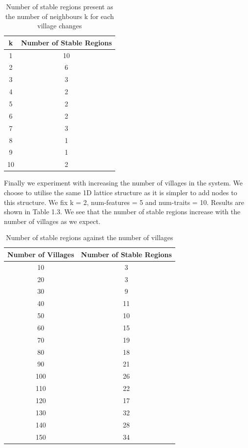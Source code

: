 \begin{table}[ht]
    \centering
    \begin{tabular}{c|c}
    \hline
    k & Number of Stable Regions \\
    \hline
    1 & 10\\
    2 & 6\\
    3 & 3\\
    4 & 2\\
    5 & 2\\
    6 & 2\\
    7 & 3\\
    8 & 1\\
    9 & 1\\
    10 & 2\\
    \hline
    \end{tabular}
    \caption{Number of stable regions present as the number of neighbours k for each village changes}
    \label{tab:my_label}
\end{table}
    \centering

    Finally we experiment with increasing the number of villages in the system. We choose to utilise the same 1D lattice structure as it is simpler to add nodes to this structure. We fix k = 2, num-features = 5 and num-traits = 10. Results are shown in Table 1.3. We see that the number of stable regions increase with the number of villages as we expect. 

\begin{table}[ht]
    \centering
    \begin{tabular}{c|c}
        Number of Villages & Number of Stable Regions  \\
        \hline
         10 & 3 \\
         20 & 3\\
         30 & 9\\
         40 & 11\\
         50 & 10\\
         60 & 15\\
         70 & 19\\
         80 & 18\\
         90 & 21\\
         100 & 26\\
         110 & 22\\
         120 & 17\\
         130 & 32\\
         140 & 28\\
         150 & 34\\
    \end{tabular}
    \caption{Number of stable regions against the number of villages}
    \label{tab:my_label}
\end{table}
\newpage